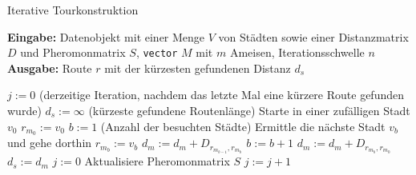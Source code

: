 \documentclass[doktyp=barbeit, sprache=german]{TUBAFarbeiten}
\begin{document}
\begin{algorithm}
\caption{Iterative Tourkonstruktion}
\label{IterativeTour}
\textbf{Eingabe:} Datenobjekt mit einer Menge $V$ von Städten sowie einer Distanzmatrix $D$ und Pheromonmatrix $S$, \texttt{vector} $M$ mit $m$ Ameisen, Iterationsschwelle $n$
\\\textbf{Ausgabe:} Route $r$ mit der kürzesten gefundenen Distanz $d_s$
\begin{algorithmic}[1]
\State $j := 0$ (derzeitige Iteration, nachdem das letzte Mal eine kürzere Route gefunden wurde)
\State $d_s := \infty$ (kürzeste gefundene Routenlänge)
\State Starte in einer zufälligen Stadt $v_0$
\State $r_{m_0} := v_0$
\State $b := 1$ (Anzahl der besuchten Städte)
\State Ermittle die nächste Stadt $v_b$ und gehe dorthin
\State $r_{m_b} := v_b$
\State $d_m := d_m + D_{r_{m_{b-1}},r_{m_b}}$
\State $b := b + 1$
\EndWhile
\State $d_m := d_m + D_{r_{m_b},r_{m_0}}$
\State $d_s := d_m$
\State $j := 0$
\EndIf
\State Aktualisiere Pheromonmatrix $S$
\State $j := j + 1$
\EndIf
\EndFor
\end{algorithmic}
\end{algorithm}
\end{document}
